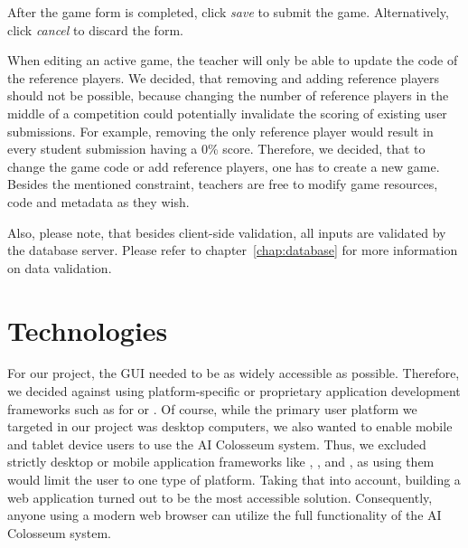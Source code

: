 After the game form is completed, click \emph{save} to submit the game. Alternatively, click \emph{cancel} to discard the form.

When editing an active game, the teacher will only be able to update the code of the reference players. We decided, that removing and adding reference players should not be possible, because changing the number of reference players in the middle of a competition could potentially invalidate the scoring of existing user submissions. For example, removing the only reference player would result in every student submission having a 0\% score. Therefore, we decided, that to change the game code or add reference players, one has to create a new game. Besides the mentioned constraint, teachers are free to modify game resources, code and metadata as they wish.

Also, please note, that besides client-side validation, all inputs are validated by the database server. Please refer to chapter~\ref{chap:database} for more information on data validation.


\section{Technologies}


For our project, the GUI needed to be as widely accessible as possible. Therefore, we decided against using platform-specific or proprietary application development frameworks such as  for  or . Of course, while the primary user platform we targeted in our project was desktop computers, we also wanted to enable mobile and tablet device users to use the AI Colosseum system. Thus, we excluded strictly desktop or mobile application frameworks like , , and , as using them would limit the user to one type of platform. Taking that into account, building a web application turned out to be the most accessible solution. Consequently, anyone using a modern web browser can utilize the full functionality of the AI Colosseum system.

